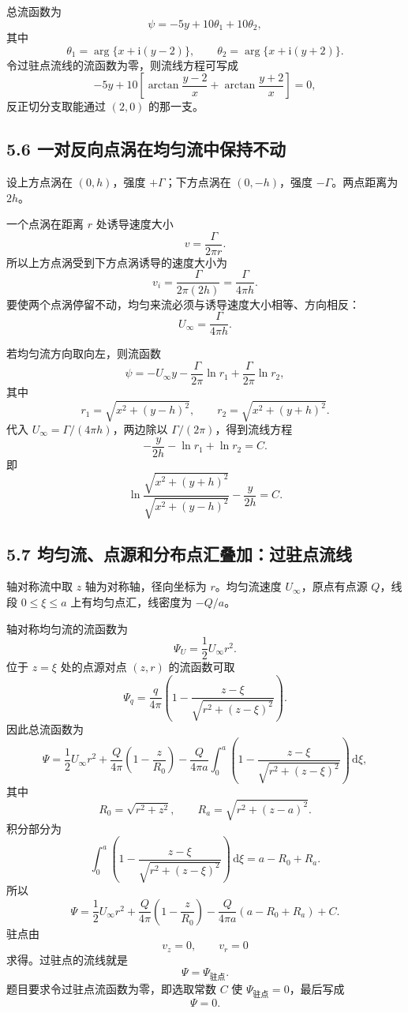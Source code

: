 ﻿\documentclass[UTF8,zihao=-4]{ctexart}
\newcommand{\dd}{\,\mathrm d}
\newcommand{\ii}{\mathrm i}
\begin{document}
总流函数为
\[
\psi=-5y+10\theta_1+10\theta_2,
\]
其中
\[
\theta_1=\arg\{x+\ii(y-2)\},\qquad
\theta_2=\arg\{x+\ii(y+2)\}.
\]
令过驻点流线的流函数为零，则流线方程可写成
\[
\boxed{
-5y+10\left[
\arctan\frac{y-2}{x}
+\arctan\frac{y+2}{x}
\right]=0,}
\]
反正切分支取能通过 \((2,0)\) 的那一支。

\subsection*{5.6 一对反向点涡在均匀流中保持不动}

设上方点涡在 \((0,h)\)，强度 \(+\Gamma\)；下方点涡在 \((0,-h)\)，强度 \(-\Gamma\)。两点距离为 \(2h\)。

一个点涡在距离 \(r\) 处诱导速度大小
\[
v=\frac{\Gamma}{2\pi r}.
\]
所以上方点涡受到下方点涡诱导的速度大小为
\[
v_i=\frac{\Gamma}{2\pi(2h)}=\frac{\Gamma}{4\pi h}.
\]
要使两个点涡停留不动，均匀来流必须与诱导速度大小相等、方向相反：
\[
\boxed{U_\infty=\frac{\Gamma}{4\pi h}.}
\]

若均匀流方向取向左，则流函数
\[
\psi=-U_\infty y-\frac{\Gamma}{2\pi}\ln r_1
+\frac{\Gamma}{2\pi}\ln r_2,
\]
其中
\[
r_1=\sqrt{x^2+(y-h)^2},\qquad
r_2=\sqrt{x^2+(y+h)^2}.
\]
代入 \(U_\infty=\Gamma/(4\pi h)\)，两边除以 \(\Gamma/(2\pi)\)，得到流线方程
\[
-\frac{y}{2h}-\ln r_1+\ln r_2=C.
\]
即
\[
\boxed{
\ln\frac{\sqrt{x^2+(y+h)^2}}{\sqrt{x^2+(y-h)^2}}
-\frac{y}{2h}=C.}
\]

\subsection*{5.7 均匀流、点源和分布点汇叠加：过驻点流线}

轴对称流中取 \(z\) 轴为对称轴，径向坐标为 \(r\)。均匀流速度 \(U_\infty\)，原点有点源 \(Q\)，线段 \(0\le \xi\le a\) 上有均匀点汇，线密度为 \(-Q/a\)。

轴对称均匀流的流函数为
\[
\Psi_U=\frac12U_\infty r^2.
\]
位于 \(z=\xi\) 处的点源对点 \((z,r)\) 的流函数可取
\[
\Psi_q=\frac{q}{4\pi}
\left(1-\frac{z-\xi}{\sqrt{r^2+(z-\xi)^2}}\right).
\]
因此总流函数为
\[
\Psi=\frac12U_\infty r^2
+\frac{Q}{4\pi}\left(1-\frac{z}{R_0}\right)
-\frac{Q}{4\pi a}\int_0^a
\left(1-\frac{z-\xi}{\sqrt{r^2+(z-\xi)^2}}\right)\dd\xi,
\]
其中
\[
R_0=\sqrt{r^2+z^2},\qquad R_a=\sqrt{r^2+(z-a)^2}.
\]
积分部分为
\[
\int_0^a
\left(1-\frac{z-\xi}{\sqrt{r^2+(z-\xi)^2}}\right)\dd\xi
=a-R_0+R_a .
\]
所以
\[
\boxed{
\Psi=\frac12U_\infty r^2
+\frac{Q}{4\pi}\left(1-\frac{z}{R_0}\right)
-\frac{Q}{4\pi a}(a-R_0+R_a)+C.}
\]
驻点由
\[
v_z=0,\qquad v_r=0
\]
求得。过驻点的流线就是
\[
\boxed{\Psi=\Psi_{\text{驻点}}.}
\]
题目要求令过驻点流函数为零，即选取常数 \(C\) 使 \(\Psi_{\text{驻点}}=0\)，最后写成
\[
\boxed{\Psi=0.}
\]
\end{document}
